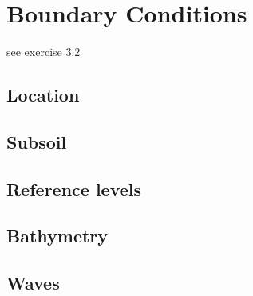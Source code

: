 \chapter{Boundary Conditions}

see exercise 3.2

\section{Location}

\section{Subsoil}

\section{Reference levels}

\section{Bathymetry}

\section{Waves}